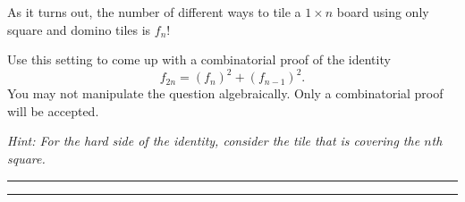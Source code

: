 \documentclass{article}
\theoremstyle{definition}
\newenvironment{solution}{\bigskip\hrule{\hfill}}{\bigskip\hrule{\hfill}} %
\begin{document}
\noindent As it turns out, the number of different ways to tile a $1\times n$ board using only square and domino tiles is $f_n$! \bigskip

\noindent Use this setting to come up with a combinatorial proof of the identity $$f_{2n}=\left(f_n\right)^2+\left(f_{n-1}\right)^2.$$ You may not manipulate the question algebraically. Only a combinatorial proof will be accepted. \bigskip

\noindent \emph{Hint: For the hard side of the identity, consider the tile that is covering the $n$th square.}
\begin{solution}


\end{solution}

\end{document}
